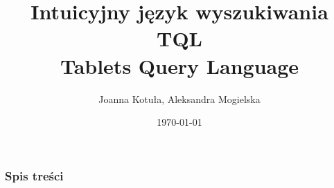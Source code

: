 \documentclass[xcolor=dvipsnames,10pt]{beamer}
\author{Joanna Kotuła, Aleksandra Mogielska}
\institute[...]{Wydział Matematyki, Informatyki i Mechaniki\\
Uniwersytet Warszawski}
\title[Intuicyjny język wyszukiwania TQL (Tablets Query Language)]{\bf  Intuicyjny język wyszukiwania TQL \\
Tablets Query Language}
\date{\today}
\begin{document}
\begin{frame}
     \titlepage
\end{frame}

\begin{frame}
     \frametitle{Spis treści}
     \tableofcontents
\end{frame}






%    
% 
% 







% 

\end{document}

